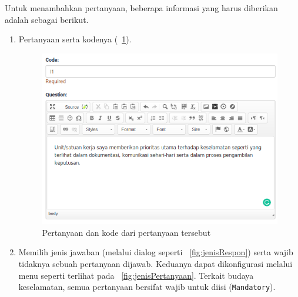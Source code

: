 Untuk menambahkan pertanyaan, beberapa informasi yang harus diberikan adalah sebagai berikut.
\begin{enumerate}
  \item Pertanyaan serta kodenya (\figurename~\ref{fig:pertanyaanDanKode}).\\
  \begin{figure}
    \begin{center}
      \includegraphics[scale=.5]{pics/pertanyaanDanKode.png}
      \caption{Pertanyaan dan kode dari pertanyaan tersebut}
      \label{fig:pertanyaanDanKode}
    \end{center}
  \end{figure}
  \item Memilih jenis jawaban (melalui dialog seperti \figurename~\ref{fig:jenisRespon}) serta wajib tidaknya sebuah pertanyaan dijawab. Keduanya dapat dikonfigurasi melalui menu seperti terlihat pada \figurename~\ref{fig:jenisPertanyaan}. Terkait budaya keselamatan, semua pertanyaan bersifat wajib untuk diisi (\texttt{Mandatory}).\\
  \begin{figure}
    \begin{center}

\end{center}
\end{figure}
\end{enumerate}
